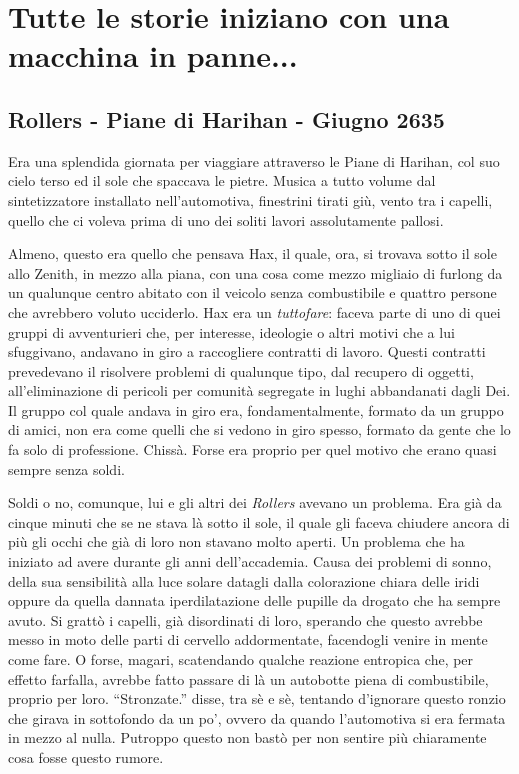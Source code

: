 \chapter{Tutte le storie iniziano con una macchina in panne...}

\section{Rollers - Piane di Harihan - Giugno 2635}
    Era una splendida giornata per viaggiare attraverso le Piane di
    Harihan, col suo cielo terso ed il sole che spaccava le pietre. Musica
    a tutto volume dal sintetizzatore installato nell'automotiva,
    finestrini tirati giù, vento tra i capelli, quello che ci voleva prima
    di uno dei soliti lavori assolutamente pallosi.

    Almeno, questo era quello che pensava Hax, il quale, ora, si trovava
    sotto il sole allo Zenith, in mezzo alla piana, con una cosa come mezzo
    migliaio di furlong da un qualunque centro abitato con il veicolo senza
    combustibile e quattro persone che avrebbero voluto ucciderlo. Hax era un
    \emph{tuttofare}: faceva parte di uno di quei gruppi di avventurieri che,
    per interesse, ideologie o altri motivi che a lui sfuggivano, andavano
    in giro a raccogliere contratti di lavoro. Questi contratti prevedevano
    il risolvere problemi di qualunque tipo, dal recupero di oggetti,
    all'eliminazione di pericoli per comunità segregate in lughi
    abbandanati dagli Dei. Il gruppo col quale andava in giro era,
    fondamentalmente, formato da un gruppo di amici, non era come quelli
    che si vedono in giro spesso, formato da gente che lo fa solo di
    professione. Chissà. Forse era proprio per quel motivo che erano quasi
    sempre senza soldi.

    Soldi o no, comunque, lui e gli altri dei \emph{Rollers} avevano un
    problema. Era già da cinque minuti che se ne stava là sotto il sole, il
    quale gli faceva chiudere ancora di più gli occhi che già di loro non
    stavano molto aperti. Un problema che ha iniziato ad avere durante gli
    anni dell'accademia. Causa dei problemi di sonno, della sua sensibilità
    alla luce solare datagli dalla colorazione chiara delle iridi oppure da
    quella dannata iperdilatazione delle pupille da drogato che ha sempre
    avuto. Si grattò i capelli, già disordinati di loro, sperando che
    questo avrebbe messo in moto delle parti di cervello addormentate,
    facendogli venire in mente come fare. O forse, magari, scatendando
    qualche reazione entropica che, per effetto farfalla, avrebbe fatto
    passare di là un autobotte piena di combustibile, proprio per loro.
    ``Stronzate.'' disse, tra sè e sè, tentando d'ignorare questo ronzio
    che girava in sottofondo da un po', ovvero da quando l'automotiva si
    era fermata in mezzo al nulla. Putroppo questo non bastò per non
    sentire più chiaramente cosa fosse questo rumore.

